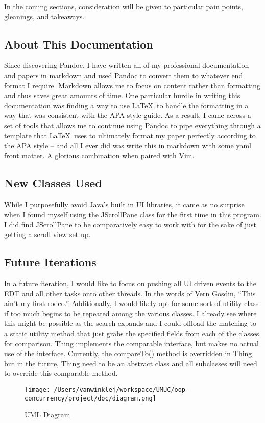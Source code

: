 \documentclass[english,floatsintext,man]{apa6}
\begin{document}
In the coming sections, consideration will be given to particular pain
points, gleanings, and takeaways.

\subsection{About This Documentation}\label{about-this-documentation}

Since discovering Pandoc, I have written all of my professional
documentation and papers in markdown and used Pandoc to convert them to
whatever end format I require. Markdown allows me to focus on content
rather than formatting and thus saves great amounts of time. One
particular hurdle in writing this documentation was finding a way to use
\LaTeX~to handle the formatting in a way that was consistent with the
APA style guide. As a result, I came across a set of tools that allows
me to continue using Pandoc to pipe everything through a template that
\LaTeX~uses to ultimately format my paper perfectly according to the APA
style -- and all I ever did was write this in markdown with some yaml
front matter. A glorious combination when paired with Vim.

\subsection{New Classes Used}\label{new-classes-used}

While I purposefully avoid Java's built in UI libraries, it came as no
surprise when I found myself using the JScrollPane class for the first
time in this program. I did find JScrollPane to be comparatively easy to
work with for the sake of just getting a scroll view set up.

\subsection{Future Iterations}\label{future-iterations}

In a future iteration, I would like to focus on pushing all UI driven
events to the EDT and all other tasks onto other threads. In the words
of Vern Gosdin, \enquote{This ain't my first rodeo.} Additionally, I
would likely opt for some sort of utility class if too much begins to be
repeated among the various classes. I already see where this might be
possible as the search expands and I could offload the matching to a
static utility method that just grabs the specified fields from each of
the classes for comparison. Thing implements the comparable interface,
but makes no actual use of the interface. Currently, the compareTo()
method is overridden in Thing, but in the future, Thing need to be an
abstract class and all subclasses will need to override this comparable
method.

\begin{figure}[htbp]
\centering
\texttt{[image: /Users/vanwinklej/workspace/UMUC/oop-concurrency/project/doc/diagram.png]}
\caption{UML Diagram}
\end{figure}

\setlength{\parindent}{-0.5in} \setlength{\leftskip}{0.5in}
\end{document}
